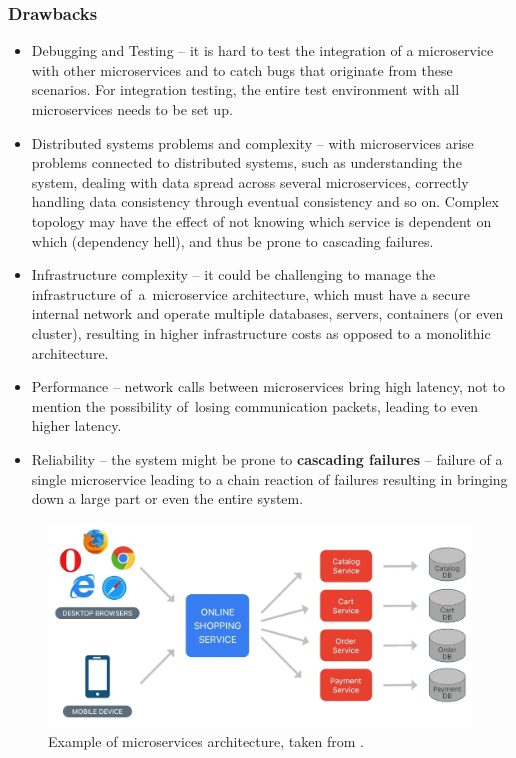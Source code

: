 \subsubsection{Drawbacks}
\begin{itemize}
    \item Debugging and Testing -- it is hard to test the integration of a microservice with other microservices and to catch bugs that originate from these scenarios. For integration testing, the entire test environment with all microservices needs to be set up.
    
    \item Distributed systems problems and complexity -- with microservices arise problems connected to distributed systems, such as understanding the system, dealing with data spread across several microservices, correctly handling data consistency through eventual consistency and so on. Complex topology may have the effect of not knowing which service is dependent on which (dependency hell), and thus be prone to cascading failures.
    
    \item Infrastructure complexity -- it could be challenging to manage the infrastructure of~a~microservice architecture, which must have a secure internal network and operate multiple databases, servers, containers (or even cluster), resulting in higher infrastructure costs as opposed to a monolithic architecture.
    
    \item Performance -- network calls between microservices bring high latency, not to mention the possibility of~losing communication packets, leading to even higher latency. 
    
    \item Reliability -- the system might be prone to \textbf{cascading failures} -- failure of a single microservice leading to a chain reaction of failures resulting in bringing down a large part or even the entire system.
\end{itemize}

\begin{figure} [H]
    \centering
    \includegraphics[width=\textwidth]{figures/microservices.png}
    \caption{Example of microservices architecture, taken from \cite{siraj_ul_haq:intro_monolith_and_microservices}.}
    \label{fig:micorservices_architecture}
\end{figure}


